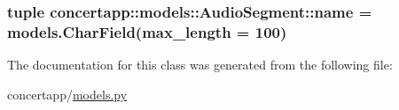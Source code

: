 \label{classconcertapp_1_1models_1_1_audio_segment_ad57bff6ba4812881057215a7b31d452c}
\hypertarget{classconcertapp_1_1models_1_1_audio_segment_acb5c961694a3f5256efc69dcf0611a5b}{
\subsubsection[{name}]{\setlength{\rightskip}{0pt plus 5cm}tuple {\bf concertapp::models::AudioSegment::name} = models.CharField(max\_\-length = 100)}}
\label{classconcertapp_1_1models_1_1_audio_segment_acb5c961694a3f5256efc69dcf0611a5b}


The documentation for this class was generated from the following file:\begin{DoxyCompactItemize}
\item 
concertapp/\hyperlink{models_8py}{models.py}\end{DoxyCompactItemize}
